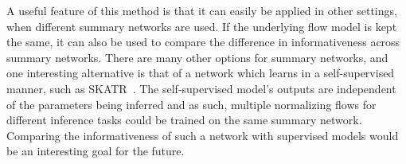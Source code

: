 A useful feature of this method is that it can easily be applied in other settings, when different summary networks are used. If the underlying flow model is kept the same, it can also be used to compare the difference in informativeness across summary networks. There are many other options for summary networks, and one interesting alternative is that of a network which learns in a self-supervised manner, such as SKATR~\cite{Ayo_2025}. The self-supervised model's outputs are independent of the parameters being inferred and as such, multiple normalizing flows for different inference tasks could be trained on the same summary network. Comparing the informativeness of such a network with supervised models would be an interesting goal for the future.